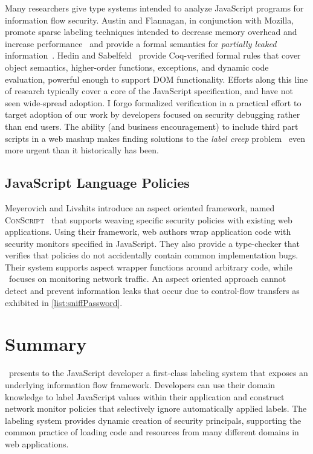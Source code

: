 Many researchers give type systems intended to analyze JavaScript programs for information flow security.
Austin and Flannagan, in conjunction with Mozilla, promote sparse labeling techniques intended to decrease memory overhead and increase performance~\cite{austin.flanagan+09} and provide a formal semantics for \emph{partially leaked} information~\cite{austin.flanagan+10}.
Hedin and Sabelfeld~\cite{hedin.sabelfeld+12} provide Coq-verified formal rules that cover object semantics, higher-order functions, exceptions, and dynamic code evaluation, powerful enough to support DOM functionality.
Efforts along this line of research typically cover a core of the JavaScript specification, and have not seen wide-spread adoption.
I forgo formalized verification in a practical effort to target adoption of our work by developers focused on security debugging rather than end users.
The ability (and business encouragement) to include third part scripts in a web mashup makes finding solutions to the \emph{label creep} problem~\cite{sabelfeld.myers+03} even more urgent than it historically has been.

\subsection{JavaScript Language Policies}

Meyerovich and Livshits introduce an aspect oriented framework, named \textsc{ConScript}~\cite{meyerovich.livshits+10} that supports weaving specific security policies with existing web applications.
Using their framework, web authors wrap application code with security monitors specified in JavaScript.
They also provide a type-checker that verifies that policies do not accidentally contain common implementation bugs.
Their system supports aspect wrapper functions around arbitrary code, while \FlowCore\ focuses on monitoring network traffic.
An aspect oriented approach cannot detect and prevent information leaks that occur due to control-flow transfers as exhibited in \autoref{list:sniffPassword}.

\section{Summary}
\label{sec:first-class-summar}

\FlowCore\ presents to the JavaScript developer a first-class labeling system that exposes an underlying information flow framework.
Developers can use their domain knowledge to label JavaScript values within their application and construct network monitor policies that selectively ignore automatically applied labels.
The labeling system provides dynamic creation of security principals, supporting the common practice of loading code and resources from many different domains in web applications.

